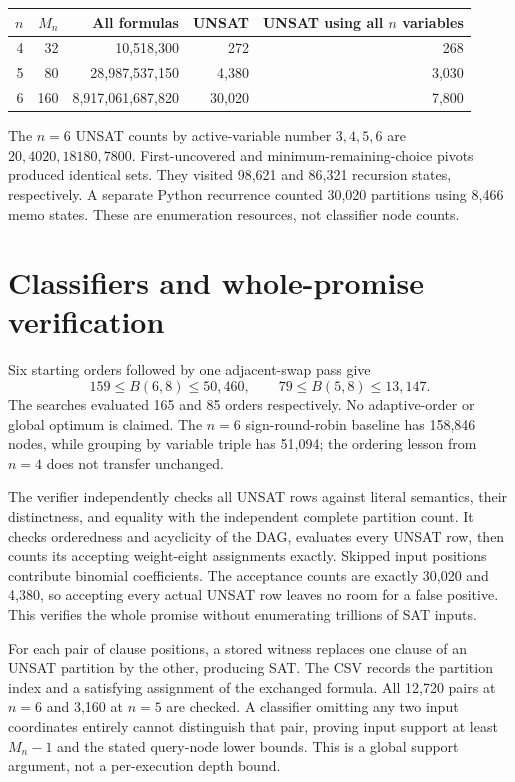 \documentclass[11pt]{article}
\begin{document}
\begin{center}
\begin{tabular}{rrrrr}
\toprule
$n$ & $M_n$ & All formulas & UNSAT & UNSAT using all $n$ variables\\
\midrule
4&32&10,518,300&272&268\\
5&80&28,987,537,150&4,380&3,030\\
6&160&8,917,061,687,820&30,020&7,800\\
\bottomrule
\end{tabular}
\end{center}
The $n=6$ UNSAT counts by active-variable number $3,4,5,6$ are
$20,4020,18180,7800$. First-uncovered and minimum-remaining-choice pivots
produced identical sets. They visited 98,621 and 86,321 recursion states,
respectively. A separate Python recurrence counted 30,020 partitions using
8,466 memo states. These are enumeration resources, not classifier node counts.

\section*{Classifiers and whole-promise verification}
Six starting orders followed by one adjacent-swap pass give
\[
159\le B(6,8)\le50,460,\qquad 79\le B(5,8)\le13,147.
\]
The searches evaluated 165 and 85 orders respectively. No adaptive-order or
global optimum is claimed. The $n=6$ sign-round-robin baseline has 158,846
nodes, while grouping by variable triple has 51,094; the ordering lesson from
$n=4$ does not transfer unchanged.

The verifier independently checks all UNSAT rows against literal semantics,
their distinctness, and equality with the independent complete partition count.
It checks orderedness and acyclicity of the DAG, evaluates every UNSAT row,
then counts its accepting weight-eight assignments exactly. Skipped input
positions contribute binomial coefficients. The acceptance counts are exactly
30,020 and 4,380, so accepting every actual UNSAT row leaves no room for a
false positive. This verifies the whole promise without enumerating trillions
of SAT inputs.

For each pair of clause positions, a stored witness replaces one clause of
an UNSAT partition by the other, producing SAT. The CSV records the partition
index and a satisfying assignment of the exchanged formula. All 12,720 pairs
at $n=6$ and 3,160 at $n=5$ are checked. A classifier omitting any two input
coordinates entirely cannot distinguish that pair, proving input support at
least $M_n-1$ and the stated query-node lower bounds. This is a global support
argument, not a per-execution depth bound.
\end{document}
